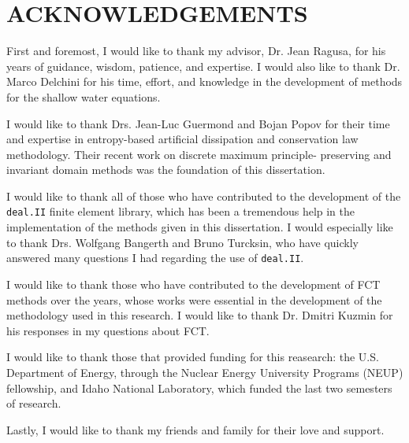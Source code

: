 \chapter*{ACKNOWLEDGEMENTS}

\indent
First and foremost, I would like to thank my advisor, Dr. Jean Ragusa,
for his years of guidance, wisdom, patience, and expertise. I would also like to
thank Dr. Marco Delchini for his time, effort, and
knowledge in the development of methods for the shallow water equations.

I would like to thank Drs. Jean-Luc Guermond and Bojan Popov for their
time and expertise in entropy-based artificial dissipation and
conservation law methodology. Their recent work on discrete maximum principle-
preserving and invariant domain methods was the foundation of this dissertation.

I would like to thank all of those who have contributed to the
development of the \texttt{deal.II} finite element library, which has been
a tremendous help in the implementation of the methods given in this
dissertation. I would especially like to thank Drs. Wolfgang Bangerth
and Bruno Turcksin, who have quickly answered many questions I had regarding
the use of \texttt{deal.II}.

I would like to thank those who have contributed to the development
of FCT methods over the years, whose works were essential in the development
of the methodology used in this research. I would like to thank Dr. Dmitri Kuzmin
for his responses in my questions about FCT.

I would like to thank those that provided funding for this reasearch:
the U.S. Department of Energy, through the Nuclear Energy University
Programs (NEUP) fellowship, and Idaho National Laboratory, which funded
the last two semesters of research.

Lastly, I would like to thank my friends and family for their love and support.

\pagebreak{}
